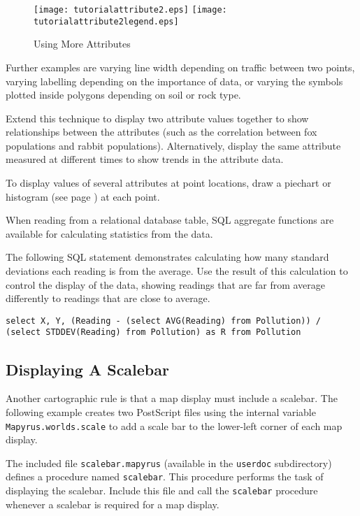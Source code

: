 

\begin{figure}[htb]
\texttt{[image: tutorialattribute2.eps]}
\texttt{[image: tutorialattribute2legend.eps]}
\caption{Using More Attributes}
\label{tutorialattribute2}
\end{figure}

Further examples are varying line width depending on traffic between
two points, varying labelling depending on the importance of data,
or varying the symbols plotted inside
polygons depending on soil or rock type.

Extend this technique to display two attribute values together to show
relationships between the attributes (such as the correlation between fox
populations and rabbit populations).  Alternatively, display the same attribute
measured at different times to show trends in the attribute data.

To display values of several attributes at point locations, draw a
piechart or histogram (see page \pageref{piechart}) at each point.

When reading from a relational database table,
SQL aggregate functions are available for calculating
statistics from the data.

The following SQL statement demonstrates calculating how many
standard deviations each reading is from the average.  Use
the result of this calculation to control the display of the data,
showing readings that are far from average differently to readings
that are close to average.

\begin{verbatim}
select X, Y, (Reading - (select AVG(Reading) from Pollution)) /
(select STDDEV(Reading) from Pollution) as R from Pollution
\end{verbatim}


\subsection{Displaying A Scalebar}
\label{tutorialscalebar}

Another cartographic rule is that a map display must include a scalebar.  The
following example creates two PostScript files using the internal variable
\texttt{Mapyrus.worlds.scale} to add a scale bar to the lower-left corner
of each map display.

The included file \texttt{scalebar.mapyrus} (available in the \texttt{userdoc}
subdirectory) defines a procedure named \texttt{scalebar}.  This procedure
performs the task of displaying the scalebar.  Include this file and call the
\texttt{scalebar} procedure whenever a scalebar is required for a map display.

